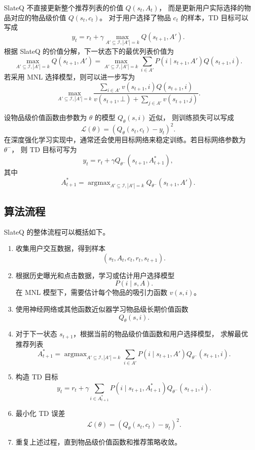 \documentclass[11pt]{ctexart}
\begin{document}
SlateQ 不直接更新整个推荐列表的价值 $Q(s_t,A_t)$，
而是更新用户实际选择的物品对应的物品级价值 $Q(s_t,c_t)$。
对于用户选择了物品 $c_t$ 的样本，TD 目标可以写成
\[
y_t
=
r_t
+
\gamma
\max_{A'\subseteq \mathcal{I}, |A'|=k}
Q(s_{t+1},A').
\]
根据 SlateQ 的价值分解，下一状态下的最优列表价值为
\[
\max_{A'\subseteq \mathcal{I}, |A'|=k}
Q(s_{t+1},A')
=
\max_{A'\subseteq \mathcal{I}, |A'|=k}
\sum_{i\in A'}
P(i\mid s_{t+1},A')Q(s_{t+1},i).
\]
若采用 MNL 选择模型，则可以进一步写为
\[
\max_{A'\subseteq \mathcal{I}, |A'|=k}
\frac{
\sum_{i\in A'}v(s_{t+1},i)Q(s_{t+1},i)
}{
v(s_{t+1},\bot)+\sum_{j\in A'}v(s_{t+1},j)
}.
\]

设物品级价值函数由参数为 $\theta$ 的模型 $Q_{\theta}(s,i)$ 近似，
则训练损失可以写成
\[
\mathcal{L}(\theta)
=
\left(
Q_{\theta}(s_t,c_t)-y_t
\right)^2.
\]
在深度强化学习实现中，通常还会使用目标网络来稳定训练。若目标网络参数为 $\theta^{-}$，
则 TD 目标可写为
\[
y_t
=
r_t
+
\gamma
Q_{\theta^{-}}(s_{t+1},A_{t+1}^{*}),
\]
其中
\[
A_{t+1}^{*}
=
\mathop{\arg\max}_{A'\subseteq \mathcal{I}, |A'|=k}
Q_{\theta^{-}}(s_{t+1},A').
\]

\subsection{算法流程}

SlateQ 的整体流程可以概括如下。

\begin{enumerate}
    \item 收集用户交互数据，得到样本
    \[
    (s_t,A_t,c_t,r_t,s_{t+1}).
    \]

    \item 根据历史曝光和点击数据，学习或估计用户选择模型
    \[
    P(i\mid s,A).
    \]
    在 MNL 模型下，需要估计每个物品的吸引力函数 $v(s,i)$。

    \item 使用神经网络或其他函数近似器学习物品级长期价值函数
    \[
    Q_{\theta}(s,i).
    \]

    \item 对于下一状态 $s_{t+1}$，根据当前的物品级价值函数和用户选择模型，
    求解最优推荐列表
    \[
    A_{t+1}^{*}
    =
    \mathop{\arg\max}_{A'\subseteq \mathcal{I}, |A'|=k}
    \sum_{i\in A'}P(i\mid s_{t+1},A')Q_{\theta^{-}}(s_{t+1},i).
    \]

    \item 构造 TD 目标
    \[
    y_t
    =
    r_t+
    \gamma
    \sum_{i\in A_{t+1}^{*}}
    P(i\mid s_{t+1},A_{t+1}^{*})
    Q_{\theta^{-}}(s_{t+1},i).
    \]

    \item 最小化 TD 误差
    \[
    \mathcal{L}(\theta)
    =
    \left(
    Q_{\theta}(s_t,c_t)-y_t
    \right)^2.
    \]

    \item 重复上述过程，直到物品级价值函数和推荐策略收敛。
\end{enumerate}
\end{document}
